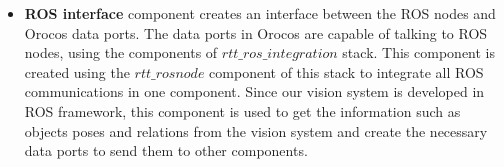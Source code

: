 \begin{itemize}
\item{\textbf{ROS interface}}
component creates an interface between the ROS nodes and Orocos data ports.
The data ports in Orocos are capable of talking to ROS nodes, using the components of $rtt\_ros\_integration$ stack.
This component is created using the $rtt\_rosnode$ component of this stack to integrate all ROS communications in one component.
Since our vision system is developed in ROS framework, this component is used to get the information such as 
objects poses and relations from the vision system and create the necessary data ports to send them to other components.
\end{itemize}

% 

